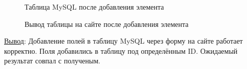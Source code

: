 \begin{figure}[p]
    \caption{Таблица MySQL после добавления элемента}
    \label{fig:mysql_table_after}
\end{figure}

\begin{figure}[p]
    \caption{Вывод таблицы на сайте после добавления элемента}
    \label{fig:site_table_after}
\end{figure}

\underline{Вывод}:
Добавление полей в таблицу MySQL через форму на сайте работает корректно. Поля добавились в таблицу под определённым ID. Ожидаемый результат совпал с полученым.

\newpage